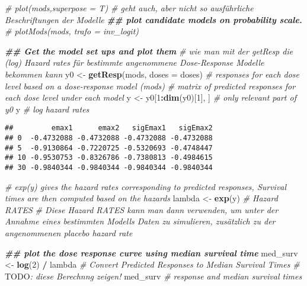 \documentclass[
]{article}
\newenvironment{Shaded}{\begin{snugshade}}{\end{snugshade}}
\newcommand{\AlertTok}[1]{\textcolor[rgb]{0.94,0.16,0.16}{#1}}
\newcommand{\AttributeTok}[1]{\textcolor[rgb]{0.13,0.29,0.53}{#1}}
\newcommand{\CommentTok}[1]{\textcolor[rgb]{0.56,0.35,0.01}{\textit{#1}}}
\newcommand{\DecValTok}[1]{\textcolor[rgb]{0.00,0.00,0.81}{#1}}
\newcommand{\DocumentationTok}[1]{\textcolor[rgb]{0.56,0.35,0.01}{\textbf{\textit{#1}}}}
\newcommand{\FunctionTok}[1]{\textcolor[rgb]{0.13,0.29,0.53}{\textbf{#1}}}
\newcommand{\NormalTok}[1]{#1}
\newcommand{\OtherTok}[1]{\textcolor[rgb]{0.56,0.35,0.01}{#1}}
\newcommand{\SpecialCharTok}[1]{\textcolor[rgb]{0.81,0.36,0.00}{\textbf{#1}}}
\begin{document}
\begin{Shaded}
\begin{Highlighting}[]
\CommentTok{\# plot(mods,superpose = T) \# geht auch, aber nicht so ausführliche Beschriftungen der Modelle}
\DocumentationTok{\#\# plot candidate models on probability scale.}
\CommentTok{\# plotMods(mods, trafo = inv\_logit)}
\end{Highlighting}
\end{Shaded}

\begin{Shaded}
\begin{Highlighting}[]
\DocumentationTok{\#\# Get the model set ups and plot them}
\CommentTok{\# wie man mit der getResp die (log) Hazard rates für bestimmte angenommene Dose{-}Response Modelle bekommen kann}
\NormalTok{y0 }\OtherTok{\textless{}{-}} \FunctionTok{getResp}\NormalTok{(mods, }\AttributeTok{doses =}\NormalTok{ doses) }\CommentTok{\# responses for each dose level based on a dose{-}response model (mods)}
\CommentTok{\# matrix of predicted responses for each dose level under each model}
\NormalTok{y }\OtherTok{\textless{}{-}}\NormalTok{ y0[}\DecValTok{1}\SpecialCharTok{:}\FunctionTok{dim}\NormalTok{(y0)[}\DecValTok{1}\NormalTok{], ] }\CommentTok{\# only relevant part of y0}
\NormalTok{y }\CommentTok{\# log hazard rates}
\end{Highlighting}
\end{Shaded}

\begin{verbatim}
##         emax1      emax2   sigEmax1   sigEmax2
## 0  -0.4732088 -0.4732088 -0.4732088 -0.4732088
## 5  -0.9130864 -0.7220725 -0.5320693 -0.4748447
## 10 -0.9530753 -0.8326786 -0.7380813 -0.4984615
## 30 -0.9840344 -0.9840344 -0.9840344 -0.9840344
\end{verbatim}

\begin{Shaded}
\begin{Highlighting}[]
\CommentTok{\# exp(y) gives the hazard rates corresponding to predicted responses, Survival times are then computed based on the hazards}
\NormalTok{lambda }\OtherTok{\textless{}{-}} \FunctionTok{exp}\NormalTok{(y) }\CommentTok{\# Hazard RATES}
\CommentTok{\# Diese Hazard RATES kann man dann verwenden, um unter der Annahme eines bestimmten Modells Daten zu simulieren, zusätzlich zu der angenommenen placebo hazard rate}

\DocumentationTok{\#\# plot the dose response curve using median survival time}
\NormalTok{med\_surv }\OtherTok{\textless{}{-}} \FunctionTok{log}\NormalTok{(}\DecValTok{2}\NormalTok{) }\SpecialCharTok{/}\NormalTok{ lambda }\CommentTok{\# Convert Predicted Responses to Median Survival Times}
\CommentTok{\# }\AlertTok{TODO}\CommentTok{: diese Berechnng zeigen!}
\NormalTok{med\_surv }\CommentTok{\# response and median survival times}
\end{Highlighting}
\end{Shaded}
\end{document}

